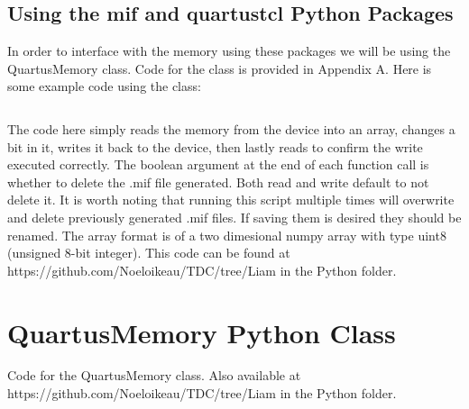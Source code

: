 \documentclass[letter,12pt]{article}
\begin{document}
\subsection{Using the mif and quartustcl Python Packages}
In order to interface with the memory using these packages we will be using the QuartusMemory class. Code for the class is provided in Appendix A. Here is some example code using the class:

\begin{mdframed}
\inputminted[linenos=true,breaklines,breakanywhere=true]{python}{../../Python/memoryExample.py}
\end{mdframed}

The code here simply reads the memory from the device into an array, changes a bit in it, writes it back to the device, then lastly reads to confirm the write executed correctly. The boolean argument at the end of each function call is whether to delete the .mif file generated. Both read and write default to not delete it. It is worth noting that running this script multiple times will overwrite and delete previously generated .mif files. If saving them is desired they should be renamed. The array format is of a two dimesional numpy array with type uint8 (unsigned 8-bit integer). 
This code can be found at https://github.com/Noeloikeau/TDC/tree/Liam in the Python folder.
\break
\appendix

\section{QuartusMemory Python Class}
Code for the QuartusMemory class. Also available at https://github.com/Noeloikeau/TDC/tree/Liam in the Python folder.
\begin{mdframed}
\inputminted[linenos=true,breaklines,breakanywhere=true]{python}{../../Python/QuartusMemory.py}
\end{mdframed}
\end{document}
